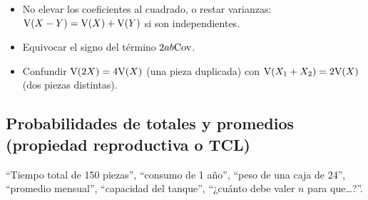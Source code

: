 \begin{ojo}
\begin{itemize}
\item No elevar los coeficientes al cuadrado, o restar varianzas: $\mathrm{V}(X-Y)=\mathrm{V}(X)+\mathrm{V}(Y)$ si son independientes.
\item Equivocar el signo del término $2ab\mathrm{Cov}$.
\item Confundir $\mathrm{V}(2X)=4\mathrm{V}(X)$ (una pieza duplicada) con $\mathrm{V}(X_1+X_2)=2\mathrm{V}(X)$ (dos piezas distintas).
\end{itemize}
\end{ojo}

\subsection{Probabilidades de totales y promedios (propiedad reproductiva o TCL)}\label{p:tcl}
\begin{cuando}
``Tiempo total de 150 piezas'', ``consumo de 1 año'', ``peso de una caja de 24'', ``promedio mensual'', ``capacidad del tanque'', ``¿cuánto debe valer $n$ para que\ldots?''.
\end{cuando}
